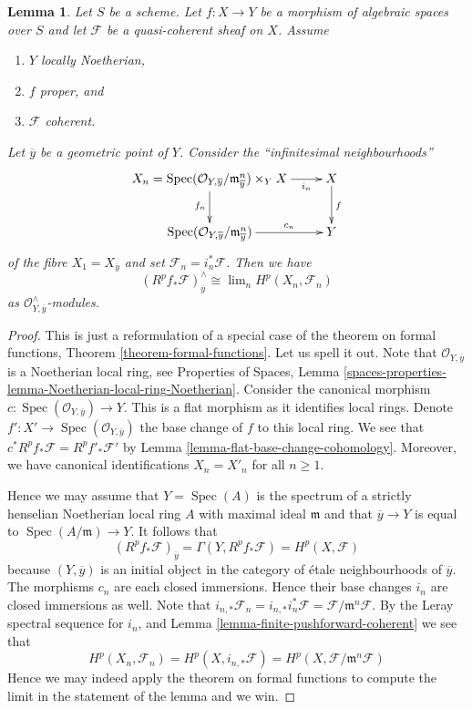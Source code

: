 \documentclass{stacks-project}
\theoremstyle{plain}
\newtheorem{lemma}[subsection]{Lemma}
\theoremstyle{definition}
\theoremstyle{remark}
\numberwithin{equation}{subsection}
\def\lim{\mathop{\mathrm{lim}}\nolimits}
\def\Spec{\mathop{\mathrm{Spec}}}
\begin{document}
\begin{lemma}
\label{lemma-formal-functions-stalk}
Let $S$ be a scheme. Let $f : X \to Y$ be a morphism of algebraic spaces
over $S$ and let $\mathcal{F}$ be a quasi-coherent sheaf on $X$. Assume
\begin{enumerate}
\item $Y$ locally Noetherian,
\item $f$ proper, and
\item $\mathcal{F}$ coherent.
\end{enumerate}
Let $\overline{y}$ be a geometric point of $Y$.
Consider the ``infinitesimal neighbourhoods''
$$
\xymatrix{
X_n =
\Spec(\mathcal{O}_{Y, \overline{y}}/\mathfrak m_{\overline{y}}^n) \times_Y X
\ar[r]_-{i_n} \ar[d]_{f_n} &
X \ar[d]^f \\
\Spec(\mathcal{O}_{Y, \overline{y}}/\mathfrak m_{\overline{y}}^n)
\ar[r]^-{c_n} & Y
}
$$
of the fibre $X_1 = X_{\overline{y}}$ and set
$\mathcal{F}_n = i_n^*\mathcal{F}$. Then we have
$$
\left(R^pf_*\mathcal{F}\right)_{\overline{y}}^\wedge
\cong
\lim_n H^p(X_n, \mathcal{F}_n)
$$
as $\mathcal{O}_{Y, \overline{y}}^\wedge$-modules.
\end{lemma}

\begin{proof}
This is just a reformulation of a special case of the theorem
on formal functions, Theorem \ref{theorem-formal-functions}.
Let us spell it out. Note that $\mathcal{O}_{Y, \overline{y}}$
is a Noetherian local ring, see
Properties of Spaces, Lemma
\ref{spaces-properties-lemma-Noetherian-local-ring-Noetherian}.
Consider the canonical morphism
$c : \Spec(\mathcal{O}_{Y, \overline{y}}) \to Y$.
This is a flat morphism as it identifies local rings.
Denote $f' : X' \to \Spec(\mathcal{O}_{Y, \overline{y}})$
the base change of $f$ to this local ring. We see that
$c^*R^pf_*\mathcal{F} = R^pf'_*\mathcal{F}'$ by
Lemma \ref{lemma-flat-base-change-cohomology}.
Moreover, we have canonical identifications $X_n = X'_n$
for all $n \geq 1$.

\medskip\noindent
Hence we may assume that $Y = \Spec(A)$ is the spectrum of
a strictly henselian Noetherian local ring $A$ with maximal ideal
$\mathfrak m$ and that $\overline{y} \to Y$ is equal to
$\Spec(A/\mathfrak m) \to Y$. It follows that
$$
\left(R^pf_*\mathcal{F}\right)_{\overline{y}} =
\Gamma(Y, R^pf_*\mathcal{F}) =
H^p(X, \mathcal{F})
$$
because $(Y, \overline{y})$ is an initial object in the category
of \'etale neighbourhoods of $\overline{y}$.
The morphisms $c_n$ are each closed immersions.
Hence their base changes $i_n$ are closed immersions as well.
Note that $i_{n, *}\mathcal{F}_n = i_{n, *}i_n^*\mathcal{F}
= \mathcal{F}/\mathfrak m^n\mathcal{F}$. By the Leray spectral sequence
for $i_n$, and Lemma \ref{lemma-finite-pushforward-coherent} we see that
$$
H^p(X_n, \mathcal{F}_n) =
H^p(X, i_{n, *}\mathcal{F}) =
H^p(X, \mathcal{F}/\mathfrak m^n\mathcal{F})
$$
Hence we may indeed apply the theorem on formal functions to compute
the limit in the statement of the lemma and we win.
\end{proof}
\end{document}
